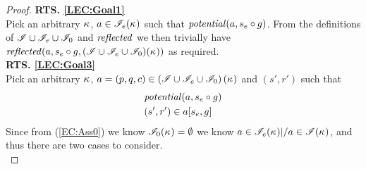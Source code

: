 \begin{lemma}
\begin{proof}
\noindent\textbf{RTS. \ref{LEC:Goal1}}\\
Pick an arbitrary $\kappa_{}$, $a \in \mathscr{I}_e(\kappa_{})$ such that $\mathit{potential}(a, s_e \circ g)$. From the definitions of $\mathscr{I} \cup \mathscr{I}_e \cup \mathscr{I}_0$ and $\mathit{reflected}$ we then trivially have $\mathit{reflected}(a, s_e \circ g, (\mathscr{I} \cup \mathscr{I}_e \cup \mathscr{I}_0)(\kappa_{}))$ as required.\\

\noindent\textbf{RTS. \ref{LEC:Goal3}}\\
Pick an arbitrary $\kappa_{}$, $a = (p, q, c) \in \left(\mathscr{I} \cup \mathscr{I}_e \cup \mathscr{I}_0 \right)(\kappa_{})$ and $(s', r')$ such that
%
\begin{align}
	& \mathit{potential}(a, s_e \circ g)  \label{LEC:ass1}\\
	& (s', r') \in a[s_e, g] \label{LEC:ass2}
\end{align}
Since from (\ref{EC:Ass0}) we know $\mathscr{I}_0(\kappa_{}) = \emptyset$ we know $a \in \mathscr{I}_e(\kappa_{}) |/  a \in\mathscr{I}(\kappa_{})$, and thus there are two cases to consider. \\


\end{proof}
\end{lemma}
